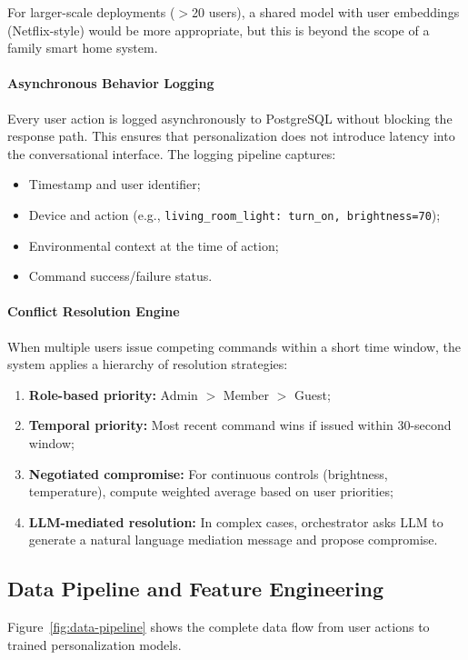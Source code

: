 For larger-scale deployments ($>$20 users), a shared model with user
embeddings (Netflix-style) would be more appropriate, but this is beyond
the scope of a family smart home system.

\paragraph{Asynchronous Behavior Logging}
Every user action is logged asynchronously to PostgreSQL without blocking
the response path. This ensures that personalization does not introduce
latency into the conversational interface. The logging pipeline captures:
\begin{itemize}
    \item Timestamp and user identifier;
    \item Device and action (e.g., \texttt{living\_room\_light: turn\_on, brightness=70});
    \item Environmental context at the time of action;
    \item Command success/failure status.
\end{itemize}

\paragraph{Conflict Resolution Engine}
When multiple users issue competing commands within a short time window,
the system applies a hierarchy of resolution strategies:
\begin{enumerate}
    \item \textbf{Role-based priority:} Admin $>$ Member $>$ Guest;
    \item \textbf{Temporal priority:} Most recent command wins if issued
    within 30-second window;
    \item \textbf{Negotiated compromise:} For continuous controls
    (brightness, temperature), compute weighted average based on user
    priorities;
    \item \textbf{LLM-mediated resolution:} In complex cases, orchestrator
    asks LLM to generate a natural language mediation message and propose
    compromise.
\end{enumerate}

\subsection{Data Pipeline and Feature Engineering}
\label{sec:data-pipeline}

Figure~\ref{fig:data-pipeline} shows the complete data flow from user
actions to trained personalization models.

